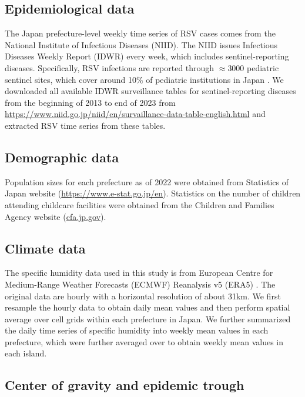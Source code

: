 \documentclass[12pt]{article}
\begin{document}
\subsection*{Epidemiological data}

The Japan prefecture-level weekly time series of RSV cases comes from the National Institute of Infectious Diseases (NIID).
The NIID issues Infectious Diseases Weekly Report (IDWR) every week, which includes sentinel-reporting diseases.
Specifically, RSV infections are reported through $\approx 3000$ pediatric sentinel sites, which cover around 10\% of pediatric institutions in Japan \citep{yamagami2019detection}.
We downloaded all available IDWR surveillance tables for sentinel-reporting diseases from the beginning of 2013 to end of 2023 from \url{https://www.niid.go.jp/niid/en/survaillance-data-table-english.html} and extracted RSV time series from these tables.

\subsection*{Demographic data}

Population sizes for each prefecture as of 2022 were obtained from Statistics of Japan website (\url{https://www.e-stat.go.jp/en}).
Statistics on the number of children attending childcare facilities were obtained from the Children and Families Agency website (\url{cfa.jp.gov}).

\subsection*{Climate data}

The specific humidity data used in this study is from European Centre for Medium-Range Weather Forecasts (ECMWF) Reanalysis v5 (ERA5) \citep{hersbach2020era5}. 
The original data are hourly with a horizontal resolution of about 31km. 
We first resample the hourly data to obtain daily mean values and then perform spatial average over cell grids within each prefecture in Japan. 
We further summarized the daily time series of specific humidity into weekly mean values in each prefecture, which were further averaged over to obtain weekly mean values in each island.

\subsection*{Center of gravity and epidemic trough}
\end{document}
